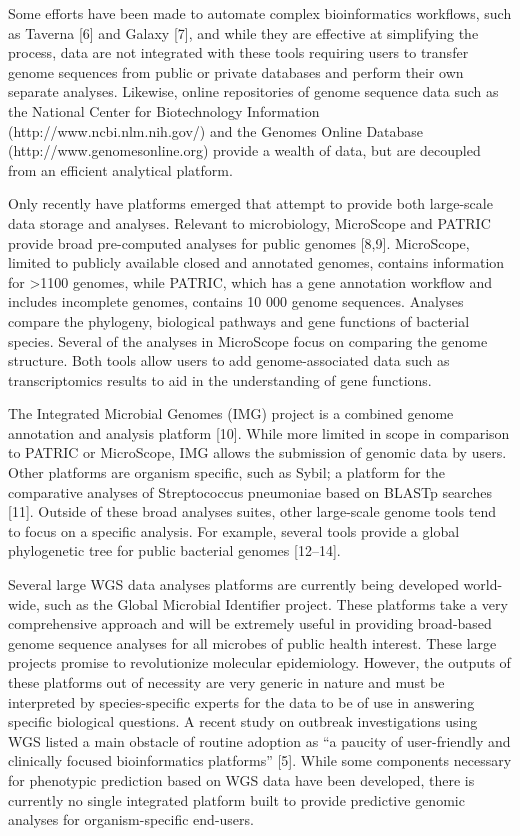 \documentclass{bmcart}
\begin{document}
Some efforts have been made to automate complex bioinformatics workflows, such as Taverna [6] and Galaxy [7], and while they are effective at simplifying the process, data are not integrated with these tools requiring users to transfer genome sequences from public or private databases and perform their own separate analyses. Likewise, online repositories of genome sequence data such as the National Center for Biotechnology Information (http://www.ncbi.nlm.nih.gov/) and the Genomes Online Database (http://www.genomesonline.org) provide a wealth of data, but are decoupled from an efficient analytical platform.

Only recently have platforms emerged that attempt to provide both large-scale data storage and analyses. Relevant to microbiology, MicroScope and PATRIC provide broad pre-computed analyses for public genomes [8,9]. MicroScope, limited to publicly available closed and annotated genomes, contains information for >1100 genomes, while PATRIC, which has a gene annotation workflow and includes incomplete genomes, contains 10 000 genome sequences. Analyses compare the phylogeny, biological pathways and gene functions of bacterial species. Several of the analyses in MicroScope focus on comparing the genome structure. Both tools allow users to add genome-associated data such
as transcriptomics results to aid in the understanding of gene functions.

The Integrated Microbial Genomes (IMG) project is a combined genome annotation and analysis platform [10]. While more limited in scope in comparison to PATRIC or MicroScope, IMG allows the submission of genomic data by users. Other platforms are organism specific, such as Sybil; a platform for the comparative analyses of Streptococcus pneumoniae based on BLASTp searches [11]. Outside of these broad analyses suites, other large-scale genome tools tend to focus on a specific analysis. For example, several tools provide a global phylogenetic tree for public bacterial genomes [12–14]. 

Several large WGS data analyses platforms are currently being developed world-wide, such as the Global Microbial Identifier project. These platforms take a very comprehensive approach and will be extremely useful in providing broad-based genome sequence analyses for all microbes of public health interest. These large projects promise to revolutionize molecular epidemiology. However, the outputs of these platforms out of necessity are very generic in nature and must be interpreted by species-specific experts for the data to be of use in answering specific biological questions. A recent study on outbreak investigations using WGS listed a main obstacle of routine adoption as “a paucity of user-friendly and clinically focused bioinformatics platforms” [5]. While some components necessary for phenotypic prediction based on WGS data have been developed, there is currently no single integrated platform built to provide predictive genomic analyses for organism-specific end-users.
\end{document}
